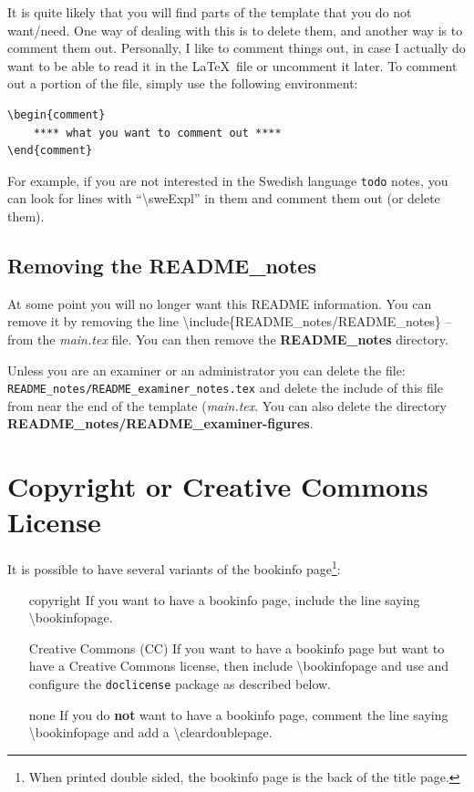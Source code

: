 \documentclass[main.tex]{subfiles}
\begin{document}
It is quite likely that you will find parts of the template that you do not want/need. One way of dealing with this is to delete them, and another way is to comment them out. Personally, I like to comment things out, in case I actually do want to be able to read it in the \LaTeX\  file or uncomment it later. To comment out a portion of the file, simply use the following environment:

\begin{lstlisting}[style=latexExampleForAuthors]
\begin{comment}
    **** what you want to comment out ****
\end{comment}
\end{lstlisting}

For example, if you are not interested in the Swedish language \texttt{todo} notes, you can look for lines with ``\textbackslash sweExpl'' in them and comment them out (or delete them).

\subsection{Removing the README\_notes}
At some point you will no longer want this README information. You can remove it by removing the line
\textbackslash include\{README\_notes/README\_notes\} -- from the \textit{main.tex} file. You can then remove the \textbf{README\_notes} directory.

Unless you are an examiner or an administrator you can delete the file: \texttt{README\_notes/README\_examiner\_notes.tex} and delete the include of this file from near the end of the template (\ie \textit{main.tex}. You can also delete the directory \textbf{README\_notes/README\_examiner-figures}.


\section[Copyright or Creative Commons License]{Copyright or Creative Commons\\ License}
\label{sec:copyrightOrCClicense}
It is possible to have several variants of the bookinfo page\footnote{When printed double sided, the bookinfo page is the back of the title page.}:
\begin{enumerate}[labelwidth =\widthof{\textbf{Creative Commons (CC)}}, leftmargin = !]
    \item[copyright] If you want to have a bookinfo page, include the line saying \textbackslash bookinfopage.
    \item[Creative Commons (CC)] If you want to have a bookinfo page but want to have a Creative Commons license, then include \textbackslash bookinfopage and use and configure the \texttt{doclicense} package as described below.
    \item[none] If you do \textbf{not} want to have a bookinfo page, comment the line saying \textbackslash bookinfopage and add a \textbackslash cleardoublepage.
\end{enumerate}
\end{document}
